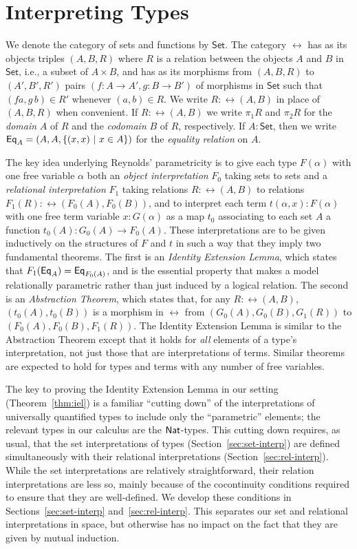 \documentclass{lmcs}
\theoremstyle{plain}\newtheorem{satz}[thm]{Satz}
\newcommand{\set}{\mathsf{Set}}
\begin{document}
{\section{Interpreting Types}\label{sec:type-interp}

We denote the category of sets and functions by $\set$. The category
$\rel$ has as its objects triples $(A,B,R)$ where $R$ is a relation
between the objects $A$ and $B$ in $\set$, i.e., a subset of $A \times
B$, and has as its morphisms from $(A,B,R)$ to $(A',B',R')$ pairs $(f
: A \to A',g : B \to B')$ of morphisms in $\set$ such that $(f a,g\,b)
\in R'$ whenever $(a,b) \in R$. We write $R : \rel(A,B)$ in place of
$(A,B,R)$ when convenient.  If $R : \rel(A,B)$ we write $\pi_1 R$ and
$\pi_2 R$ for the {\em domain} $A$ of $R$ and the {\em codomain} $B$
of $R$, respectively.  If $A : \set$, then we write $\mathsf{Eq}_A =
(A,A,\{(x,x)~|~ x \in A\})$ for the {\em equality relation} on $A$.

The key idea underlying Reynolds' parametricity is to give each type
$F(\alpha)$ with one free variable $\alpha$ both an {\em object
  interpretation} $F_0$ taking sets to sets and a \emph{relational
  interpretation} $F_1$ taking relations $R : \rel(A,B)$ to relations
$F_1 (R) : \rel(F_0 (A), F_0 (B))$, and to interpret each term
$t(\alpha,x) : F(\alpha)$ with one free term variable $x : G(\alpha)$
as a map $t_0$ associating to each set $A$ a function $t_0(A) : G_0(A)
\to F_0(A)$. These interpretations are to be given inductively on the
structures of $F$ and $t$ in such a way that they imply two
fundamental theorems. The first is an \emph{Identity Extension Lemma},
which states that $F_1(\mathsf{Eq}_A) = \mathsf{Eq}_{F_0(A)}$, and is the essential
property that makes a model relationally parametric rather than just
induced by a logical relation. The second is an \emph{Abstraction
  Theorem}, which states that, for any $R :\rel(A, B)$,
$(t_0(A),t_0(B))$ is a morphism in $\rel$ from
$(G_0(A),G_0(B),G_1(R))$ to $(F_0(A),F_0(B),F_1(R))$. The Identity
Extension Lemma is similar to the Abstraction Theorem except that it
holds for {\em all} elements of a type's interpretation, not just
those that are interpretations of terms. Similar theorems are
expected to hold for types and terms with any number of free
variables.

The key to proving the Identity Extension Lemma in our setting
(Theorem~\ref{thm:iel}) is a familiar ``cutting down'' of the
interpretations of universally quantified types to include only the
``parametric'' elements; the relevant types in our calculus are the
$\mathsf{Nat}$-types.  This cutting down requires, as usual, that the set
interpretations of types (Section~\ref{sec:set-interp}) are defined
simultaneously with their relational interpretations
(Section~\ref{sec:rel-interp}). While the set interpretations are
relatively straightforward, their relation interpretations are less
so, mainly because of the cocontinuity conditions required to ensure
that they are well-defined. We develop these conditions in
Sections~\ref{sec:set-interp} and~\ref{sec:rel-interp}. This separates
our set and relational interpretations in space, but otherwise has no
impact on the fact that they are given by mutual induction.

}
\end{document}
